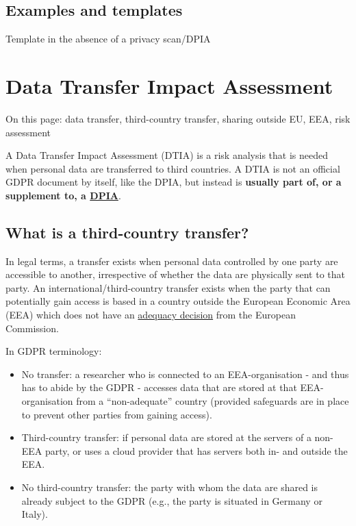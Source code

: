 \documentclass[
]{book}
\providecommand{\tightlist}{%
  \setlength{\itemsep}{0pt}\setlength{\parskip}{0pt}}
\begin{document}
\hypertarget{examples-and-templates-3}{%
\subsection{Examples and templates}\label{examples-and-templates-3}}

Template in the absence of a privacy scan/DPIA

\hypertarget{dtia}{%
\section{Data Transfer Impact Assessment}\label{dtia}}

On this page: data transfer, third-country transfer, sharing outside EU, EEA,
risk assessment

A Data Transfer Impact Assessment (DTIA) is a risk analysis that is needed when
personal data are transferred to third countries. A DTIA is not an official
GDPR document by itself, like the DPIA, but instead is \textbf{usually part of, or a
supplement to, a \protect\hyperlink{dpia}{DPIA}}.

\hypertarget{third-country-transfer}{%
\subsection{What is a third-country transfer?}\label{third-country-transfer}}

In legal terms, a transfer exists when personal data controlled by one party
are accessible to another, irrespective of whether the data are physically sent
to that party. An international/third-country transfer exists when the party
that can potentially gain access is based in a country outside the European
Economic Area (EEA) which does not have an
\href{https://ec.europa.eu/info/law/law-topic/data-protection/international-dimension-data-protection/adequacy-decisions_en}{adequacy decision}
from the European Commission.

In GDPR terminology:

\begin{itemize}
\tightlist
\item
  No transfer: a researcher who is connected to an EEA-organisation - and thus
  has to abide by the GDPR - accesses data that are stored at that EEA-organisation
  from a ``non-adequate'' country (provided safeguards are in place to prevent other
  parties from gaining access).
\item
  Third-country transfer: if personal data are stored at the servers of a
  non-EEA party, or uses a cloud provider that has servers both in- and outside
  the EEA.
\item
  No third-country transfer: the party with whom the data are shared is already
  subject to the GDPR (e.g., the party is situated in Germany or Italy).
\end{itemize}
\end{document}

